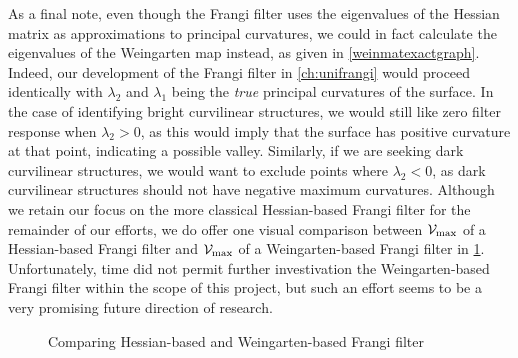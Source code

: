 As a final note, even though the Frangi filter uses the eigenvalues of the Hessian matrix as approximations to principal curvatures, we could in fact calculate the eigenvalues of the Weingarten map instead, as given in \cref{weinmatexactgraph}. Indeed, our development of the Frangi filter in \cref{ch:unifrangi} would proceed identically with $\lambda_2$ and $\lambda_1$ being the \textit{true} principal curvatures of the surface. In the case of identifying bright curvilinear structures, we would still like zero filter response when $\lambda_2 > 0$, as this would imply that the surface has positive curvature at that point, indicating a possible valley. Similarly, if we are seeking dark curvilinear structures, we would want to exclude points where $\lambda_2 < 0$, as dark curvilinear structures should not have negative maximum curvatures. Although we retain our focus on the more classical Hessian-based Frangi filter for the remainder of our efforts, we do offer one visual comparison between $\mathcal{V}_{\max}$ of a Hessian-based Frangi filter and  $\mathcal{V}_{\max}$ of a Weingarten-based Frangi filter in \cref{fig:compare-wein-hess-Vmax}.
Unfortunately, time did not permit further investivation the Weingarten-based Frangi filter within the scope of this project, but such an effort seems to be a very promising future direction of research.

\begin{figure}[t]\centering
\caption{Comparing Hessian-based and Weingarten-based Frangi filter}
\label{fig:compare-wein-hess-Vmax}
\end{figure}

